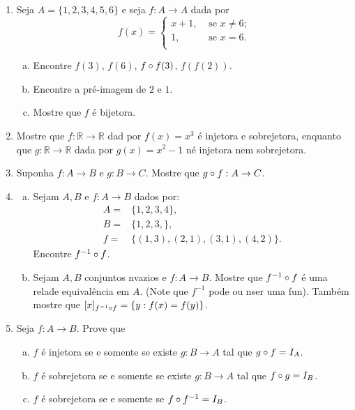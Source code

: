 \begin{enumerate}[{\bf 1.}]

\item Seja $A=\{1,2,3,4,5,6\}$ e seja $f:A\to A$ dada por 
\begin{equation*}
 f(x)=\left\{ \begin{array}{lc}
x+1, & \textrm{ se $x\neq 6$;} \\
1,    & \textrm{ se $x=    6$.} \\
\end{array}\right.   
\end{equation*}
\begin{enumerate}[a)]
\item Encontre $f(3)$, $f(6)$, $f\circ f(3)$, $f(f(2))$. 
\item Encontre a pr\'e-imagem de $2$ e $1$.
\item Mostre que $f$ \'e bijetora.
\end{enumerate}

\item Mostre que $f:\mathbb{R}\to\mathbb{R}$ dad por $f(x)=x^3$ \'e injetora e sobrejetora, enquanto que $g:\mathbb{R}\to\mathbb{R}$ dada por $g(x)=x^2-1$ n\ao \'e injetora nem sobrejetora. 

\item\label{funcexerc3} Suponha $f:A\to B$ e $g:B\to C$. Mostre que $g\circ f:A\to C$.

\item \begin{enumerate}[a)]
\item Sejam $A,B$ e $f:A\to B$ dados por:
\begin{equation*}
 \begin{aligned}
A=&\{1,2,3,4\},\\
B=&\{1,2,3,\},\\
f=&\{(1,3),(2,1),(3,1),(4,2)\}.
 \end{aligned}
\end{equation*}
Encontre $f^{-1}\circ f$.
\item Sejam $A,B$ conjuntos n\ao vazios e $f:A\to B$. Mostre que $f^{-1}\circ f$ \'e uma rela\cao de equival\^encia em $A$. (Note que $f^{-1}$ pode ou n\ao ser uma fun\caoi). Tamb\'em mostre que $[x]_{f^{-1}\circ f}=\{y: f(x)=f(y)\}$.
\end{enumerate}

\item Seja $f:A\to B$. Prove que
\begin{enumerate}[a)]
\item $f$ \'e injetora se e somente se existe $g:B\to A$ tal que $g\circ f=I_A$.
\item $f$ \'e sobrejetora se e somente se existe $g:B\to A$ tal que $f\circ g=I_B$.
\item $f$ \'e sobrejetora se e somente se $f\circ f^{-1}=I_B$.
\end{enumerate}


\end{enumerate}
